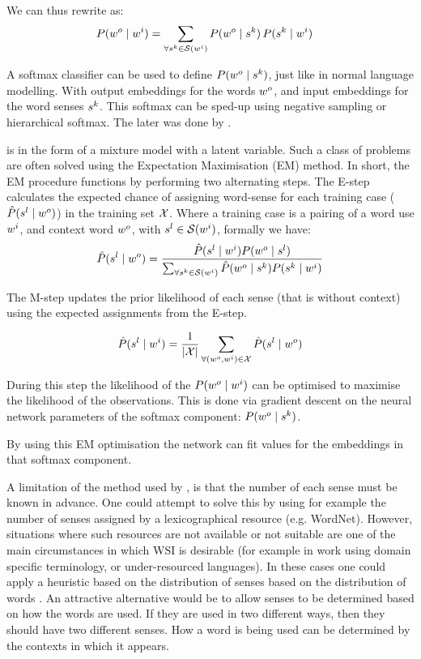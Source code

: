 \documentclass[12pt,parskip]{komatufte}
\begin{document}
We can thus rewrite  as:
\begin{align}
P(\n w_o\mid \n w_i) &= \sum_{\forall \n s_k \in \seq S(\n w_i)} P(\n w_o \mid \n s_k) \, P(\n s_k \mid \n w_i) \label{equ:tianmm2}
\end{align}

A softmax classifier can be used to define $P(\n w_o \mid \n s_k)$, just like in normal language modelling.
With output embeddings for the words $\n w_o$, and input embeddings for the word senses $\n s_k$.
This softmax can be sped-up using negative sampling or hierarchical softmax.
The later was done by .

 is in the form of a mixture model with a latent variable.
Such a class of problems are often solved using the Expectation Maximisation (EM) method.
In short, the EM procedure functions by performing two alternating steps.
The E-step calculates the expected chance of assigning word-sense for each training case ($\hat{P}(\n s_l \mid \n w_o)$) in the training set $\mathcal{X}$.
Where a training case is a pairing of a word use $\n w_i$, and context word $\n w_o$, with $\n s_l\in \seq S(\n w_i)$, formally we have:
\begin{align}
\hat{P}(\n s_l \mid \n w_o) = \frac{\hat{P}(\n s_l \mid \n w_i) P(\n w_o \mid \n s_l)}{\sum_{\forall \n s_k \in \seq S(\n w_i)} \hat{P}(\n w_o \mid \n s_k) P(\n s_k \mid \n w_i)}
\end{align}

The M-step updates the prior likelihood of each sense (that is without context) using the expected assignments from the E-step.

\begin{align}
\hat{P}(\n s_l \mid \n w_i) = \frac{1}{\left|\seq X\right|} \sum_{\forall (\n w_o,\n w_i)\in \seq X} \hat{P}(\n s_l \mid \n w_o)
\end{align}

During this step the likelihood of the $P(\n w_o \mid \n w_i)$ can be optimised to maximise the likelihood of the observations.
This is done via gradient descent on the neural network parameters of the softmax component: \mbox{$P(\n w_o \mid \n s_k)$}.

By using this EM optimisation the network can fit values for the embeddings in that softmax component.


A limitation of the method used by \textcite{tian2014probabilistic}, is that the number of each sense must be known in advance.
One could attempt to solve this by using for example the number of senses assigned by a lexicographical resource (e.g. WordNet).
However, situations where such resources are not available or not suitable are one of the main circumstances in which WSI is desirable  (for example in work using domain specific terminology, or under-resourced languages).
In these cases one could apply a heuristic based on the distribution of senses based on the distribution of words \parencite{zipf1945meaning}.
An attractive alternative would be to allow senses to be determined based on how the words are used. If they are used in two different ways, then they should have two different senses.
How a word is being used can be determined by the contexts in which it appears.
\end{document}
